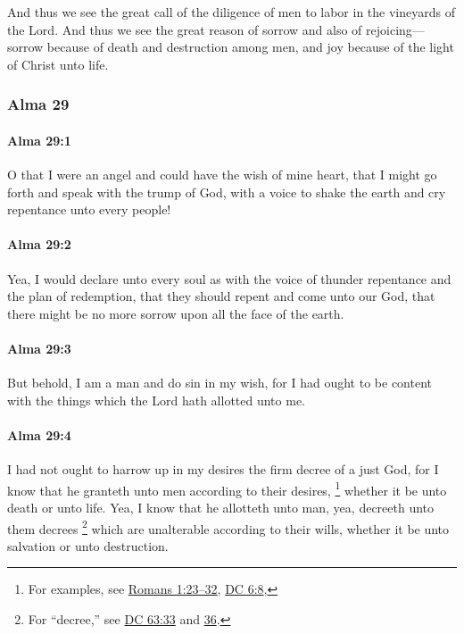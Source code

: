 			And thus we see the great call of the diligence of men
			to labor in the vineyards of the Lord.
			And thus we see the great reason of sorrow and also of rejoicing---
			sorrow because of death and destruction among men,
			and joy because of the light of Christ unto life.

	\subsubsection{Alma 29} %
		\label{ALMA-29}
		
		\paragraph{Alma 29:1} %
			\label{ALMA-29-1}

			O that I were an angel and could have the wish of mine heart,
			that I might go forth and speak with the trump of God,
			with a voice to shake the earth
			and cry repentance unto every people!

		\paragraph{Alma 29:2} %
			\label{ALMA-29-2}

			Yea, I would declare unto every soul as with the voice of thunder
			repentance and the plan of redemption,
			that they should repent and come unto our God,
			that there might be no more sorrow upon all the face of the earth.

		\paragraph{Alma 29:3} %
			\label{ALMA-29-3}

			But behold, I am a man and do sin in my wish,
			for I had ought to be content with the things which the Lord hath allotted unto me.

		\paragraph{Alma 29:4} %
			\label{ALMA-29-4}

			I had not ought to harrow up in my desires the firm decree of a just God,
			for I know that he granteth unto men according to their desires,%
				\footnote{%
					For examples, see \hyperref[ROMANS-1-23]{Romans 1:23--32}, \hyperref[DC6-8]{DC 6:8}, 
					}
			whether it be unto death or unto life.
			Yea, I know that he allotteth unto man,
			yea, decreeth unto them decrees%
				\footnote{%
					For ``decree,'' see \hyperref[DC63-33]{DC 63:33} and \hyperref[DC63-36]{36}.
					}
			which are unalterable according to their wills,
			whether it be unto salvation or unto destruction.

